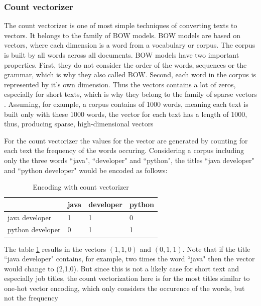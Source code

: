\documentclass[12pt, a4paper, titlepage]{article}
\begin{document}
\subsubsection*{Count vectorizer}
The count vectorizer is one of most simple techniques of converting texts to vectors. It belongs to the family of \ac{BOW} models. \ac{BOW} models are based on vectors, where each dimension is a word from a vocabulary or corpus. The corpus is built by all words across all documents. \ac{BOW} models have two important properties. First, they do not consider the order of the words, sequences or the grammar, which is why they also called \ac{BOW}. Second, each word in the corpus is represented by it's own dimension. Thus the vectors contains a lot of zeros, especially for short texts, which is why they belong to the family of sparse vectors \citep{ajose2020}.  Assuming, for example, a corpus contains of 1000 words, meaning each text is built only with these 1000 words, the vector for each text has a length of 1000, thus, producing sparse, high-dimensional vectors \citep{kulkarni2021, sarkar2016}

For the count vectorizer the values for the vector are generated by counting for each text the frequency of the words occuring. Considering a corpus including only the three words ``java", ``developer" and ``python", the titles ``java developer" and ``python developer" would be encoded as follows: 


\begin{table}[hb!]
\center
  \begin{tabular}{llll}
  \hline
                   & java & developer & python \\ \hline
  java developer   & 1    & 1         & 0      \\
  python developer & 0    & 1         & 1      \\ \hline
  \end{tabular}
  \caption{\label{tab: T11} Encoding with count vectorizer}
  \end{table}

The table \ref{tab: T11} results in the vectors $(1,1,0)$ and $(0,1,1)$. Note that if the title ``java developer" contains, for example, two times the word ``java" then the vector would change to (2,1,0). But since this is not a likely case for short text and especially job titles, the count vectorization here is for the most titles similar to one-hot vector encoding, which only considers the occurence of the words, but not the frequency \citep{kulkarni2021, sarkar2016}
\end{document}
